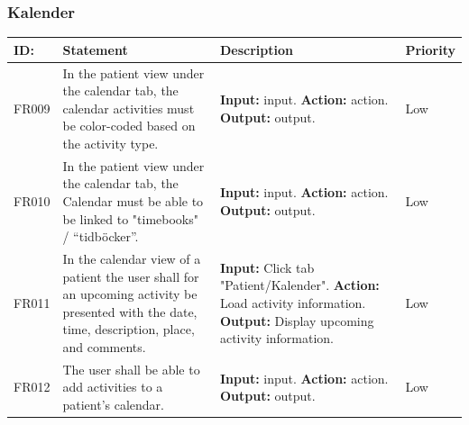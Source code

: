 \documentclass{scrreprt}
\begin{document}
\subsubsection{Kalender}
\begin{center}
\begin{tabularx}{\linewidth}{| l | X | X | l |}
\hline
\textbf{ID:} & \textbf{Statement} & \textbf{Description} & \textbf{Priority} \\ 
\hline
FR009 & In the patient view under the calendar tab, the calendar activities must be color-coded based on the activity type. & \textbf{Input:} input.
\newline \textbf{Action:} action.
\newline \textbf{Output:} output. & Low \\ 
\hline
FR010 & In the patient view under the calendar tab, the Calendar must be able to be linked to "timebooks" / “tidböcker”. & \textbf{Input:} input.
\newline \textbf{Action:} action.
\newline \textbf{Output:} output. & Low \\ 
\hline
FR011 & In the calendar view of a patient the user shall for an upcoming activity be presented with the date, time, description, place, and comments. & \textbf{Input:} Click tab "Patient/Kalender".
\newline \textbf{Action:} Load activity information.
\newline \textbf{Output:} Display upcoming  activity information. & Low \\ 
\hline
FR012 & The user shall be able to add activities to a patient's calendar.  & \textbf{Input:} input.
\newline \textbf{Action:} action.
\newline \textbf{Output:} output. & Low \\ 
\hline
\end{tabularx}
\end{center}
\end{document}

